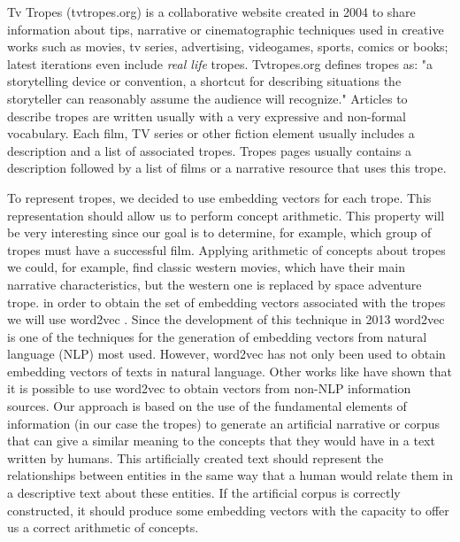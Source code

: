 \documentclass[letterpaper]{article}
\begin{document}
	Tv Tropes (tvtropes.org) is a collaborative website created in 2004 to
	share information about tips, narrative or cinematographic techniques
	used in creative works such as movies, tv series, advertising,
	videogames, sports, comics or books; latest iterations even include
	{\em real life} tropes.
	Tvtropes.org defines tropes as:
	"a storytelling device or convention, a shortcut for describing
	situations the storyteller can reasonably assume the audience will
	recognize." Articles to describe tropes are written usually with a very
	expressive and non-formal vocabulary. Each film, TV series or other
	fiction element usually includes a description and a list of associated
	tropes. Tropes pages usually contains a description followed by a list
	of films or a narrative resource that uses this trope.
	
	To represent tropes, we decided to use embedding vectors for each
	trope. This representation should allow us to perform concept
	arithmetic. This property will be very interesting since our goal is
	to determine, for example, which group of tropes must have a
	successful film. Applying arithmetic of concepts about tropes we
	could, for example, find classic western movies, which have their main
	narrative characteristics, but the western one is replaced by space
	adventure trope. in order to obtain the set of embedding vectors
	associated with the tropes we will use word2vec
	\cite{mikolov2013}. Since the development of this technique in 2013
	word2vec is one of the techniques for the generation of embedding
	vectors from natural language (NLP) most used. However, word2vec has
	not only been used to obtain embedding vectors of texts in natural
	language. Other works like \cite{kazama2018} have shown that it is
	possible to use word2vec to obtain vectors from non-NLP information
	sources. Our approach is based on the use of the fundamental elements
	of information (in our case the tropes) to generate an artificial
	narrative or corpus that can give a similar meaning to the concepts
	that they would have in a text written by humans. This artificially
	created text should represent the relationships between entities in
	the same way that a human would relate them in a descriptive text
	about these entities. If the artificial corpus is correctly
	constructed, it should produce some embedding vectors with the
	capacity to offer us a correct arithmetic of concepts. 
	
\end{document}
